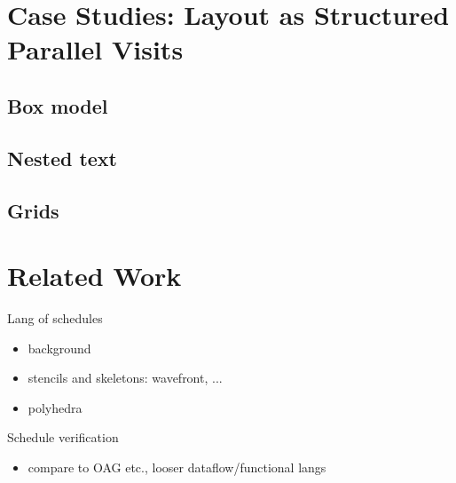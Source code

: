 \section{Case Studies: Layout as Structured Parallel Visits}
\subsection{Box model}
\subsection{Nested text}
\subsection{Grids}


\section{Related Work}
Lang of schedules
\begin{itemize}
\item background
\item stencils and skeletons: wavefront, ...
\item polyhedra
\end{itemize}
Schedule verification
\begin{itemize}
\item compare to OAG etc., looser dataflow/functional langs
\end{itemize}